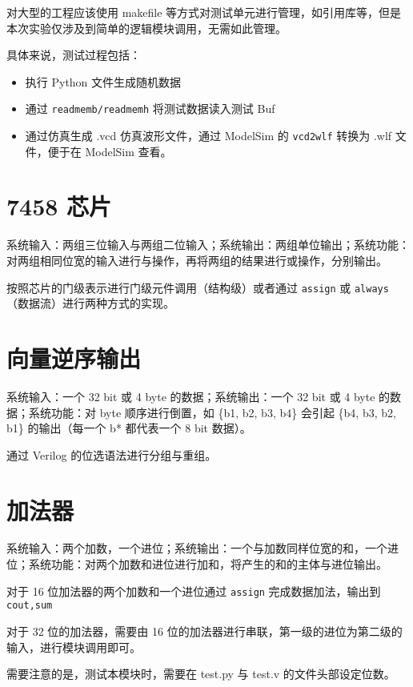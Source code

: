 \documentclass[lang=cn,11pt,a4paper,cite=authoryear]{elegantpaper}
\begin{document}
对大型的工程应该使用 makefile 等方式对测试单元进行管理，如引用库等，但是本次实验仅涉及到简单的逻辑模块调用，无需如此管理。

具体来说，测试过程包括：

\begin{itemize}
    \item 执行 Python 文件生成随机数据
    \item 通过 \lstinline{readmemb/readmemh} 将测试数据读入测试 Buf 
    \item 通过仿真生成 .vcd 仿真波形文件，通过 ModelSim 的 \lstinline{vcd2wlf} 转换为 .wlf 文件，便于在 ModelSim 查看。
\end{itemize}

\section{7458 芯片}

系统输入：两组三位输入与两组二位输入；系统输出：两组单位输出；系统功能：对两组相同位宽的输入进行与操作，再将两组的结果进行或操作，分别输出。

按照芯片的门级表示进行门级元件调用（结构级）或者通过 \lstinline{assign} 或 \lstinline{always} （数据流）进行两种方式的实现。

\section{向量逆序输出}

系统输入：一个 32 bit 或 4 byte 的数据；系统输出：一个 32 bit 或 4 byte 的数据；系统功能：对 byte 顺序进行倒置，如 \{b1, b2, b3, b4\} 会引起 \{b4, b3, b2, b1\} 的输出（每一个 b* 都代表一个 8 bit 数据）。

通过 Verilog 的位选语法进行分组与重组。

\section{加法器}


系统输入：两个加数，一个进位；系统输出：一个与加数同样位宽的和，一个进位；系统功能：对两个加数和进位进行加和，将产生的和的主体与进位输出。

对于 16 位加法器的两个加数和一个进位通过 \lstinline{assign} 完成数据加法，输出到 \lstinline{cout,sum}

对于 32 位的加法器，需要由 16 位的加法器进行串联，第一级的进位为第二级的输入，进行模块调用即可。

需要注意的是，测试本模块时，需要在 test.py 与 test.v 的文件头部设定位数。
\end{document}
